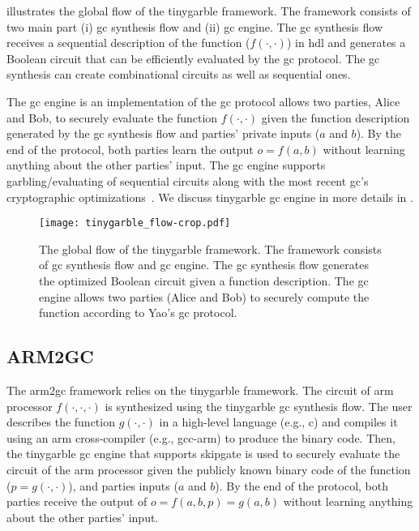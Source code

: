  illustrates the global flow of the \gls{tinygarble} framework.
The framework consists of two main part (i) \acrshort{gc} synthesis flow and (ii) \acrshort{gc} engine.
The \acrshort{gc} synthesis flow receives a sequential description of the function ($f(\cdot, \cdot)$) in \acrshort{hdl} and generates a Boolean circuit that can be efficiently evaluated by the \acrshort{gc} protocol.
The \acrshort{gc} synthesis can create combinational circuits as well as sequential ones.

The \acrshort{gc} engine is an implementation of the \acrshort{gc} protocol allows two parties, Alice and Bob, to securely evaluate the function $f(\cdot,\cdot)$ given the function description generated by the \acrshort{gc} synthesis flow and parties' private inputs ($a$ and $b$).
By the end of the protocol, both parties learn the output $o = f(a, b)$ without learning anything about the other parties' input.
The \acrshort{gc} engine supports garbling/evaluating of sequential circuits along with the most recent \acrshort{gc}'s cryptographic optimizations~\cite{kolesnikov2008improved, bellare2013efficient, zahur2015two}.
We discuss \gls{tinygarble} \acrshort{gc} engine in more details in .

\begin{figure}
\centering
\texttt{[image: tinygarble\_flow-crop.pdf]}
\caption{The global flow of the \gls{tinygarble} framework.
The framework consists of \acrshort{gc} synthesis flow and \acrshort{gc} engine.
The \acrshort{gc} synthesis flow generates the optimized Boolean circuit given a function description.
The \acrshort{gc} engine allows two parties (Alice and Bob) to securely compute the function according to Yao's \acrshort{gc} protocol.
}
\label{fig:tinygarbel-global-flow}
\end{figure}

\subsection{ARM2GC}
The \gls{arm2gc} framework relies on the \gls{tinygarble} framework.
The circuit of \gls{arm} processor $f(\cdot,\cdot,\cdot)$ is synthesized using the \gls{tinygarble} \acrshort{gc} synthesis flow.
The user describes the function $g(\cdot,\cdot)$ in a high-level language (e.g., \gls{c}) and compiles it using an \gls{arm} cross-compiler (e.g., gcc-arm) to produce the binary code.
Then, the \gls{tinygarble} \acrshort{gc} engine that supports \gls{skipgate} is used to securely evaluate the circuit of the \gls{arm} processor given the publicly known binary code of the function ($p=g(\cdot,\cdot)$), and parties inputs ($a$ and $b$).
By the end of the protocol, both parties receive the output of $o = f(a,b,p) = g(a,b)$ without learning anything about the other parties' input.


